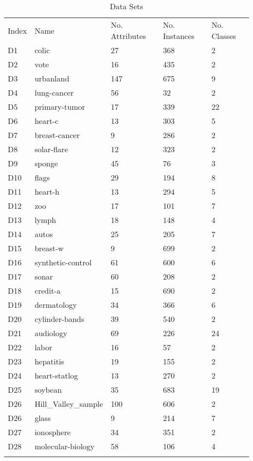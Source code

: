 \begin{table*}[h]
\caption{Data Sets}
\label{tbl:datasets}\begin{tabular}{lllll}
\noalign{\smallskip}\hline\noalign{\smallskip}
Index&Name&No. Attributes&No. Instances&No. Classes\\\noalign{\smallskip}\hline
D1&colic&27&368&2\\
D2&vote&16&435&2\\
D3&urbanland&147&675&9\\
D4&lung-cancer&56&32&2\\
D5&primary-tumor&17&339&22\\
D6&heart-c&13&303&5\\
D7&breast-cancer&9&286&2\\
D8&solar-flare&12&323&2\\
D9&sponge&45&76&3\\
D10&flags&29&194&8\\
D11&heart-h&13&294&5\\
D12&zoo&17&101&7\\
D13&lymph&18&148&4\\
D14&autos&25&205&7\\
D15&breast-w&9&699&2\\
D16&synthetic-control&61&600&6\\
D17&sonar&60&208&2\\
D18&credit-a&15&690&2\\
D19&dermatology&34&366&6\\
D20&cylinder-bands&39&540&2\\
D21&audiology&69&226&24\\
D22&labor&16&57&2\\
D23&hepatitis&19&155&2\\
D24&heart-statlog&13&270&2\\
D25&soybean&35&683&19\\
D26&Hill_Valley_sample&100&606&2\\
D26&glass&9&214&7\\
D27&ionosphere&34&351&2\\
D28&molecular-biology&58&106&4\\
\noalign{\smallskip}\hline
\end{tabular}
\end{table*}